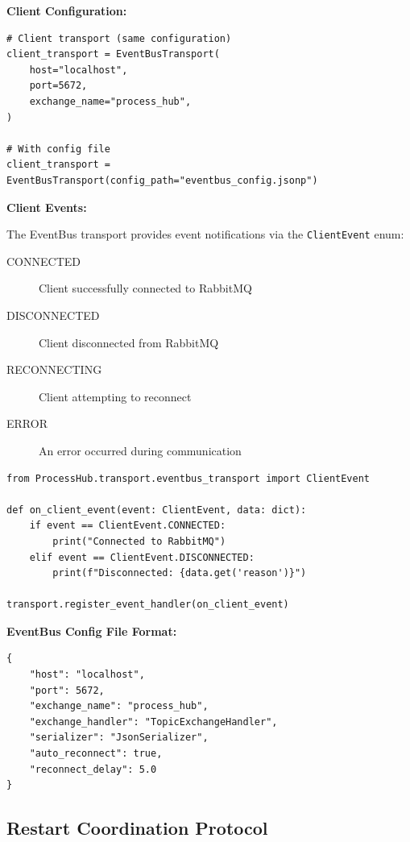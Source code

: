 \textbf{Client Configuration:}

\begin{verbatim}
# Client transport (same configuration)
client_transport = EventBusTransport(
    host="localhost",
    port=5672,
    exchange_name="process_hub",
)

# With config file
client_transport = EventBusTransport(config_path="eventbus_config.jsonp")
\end{verbatim}

\textbf{Client Events:}

The EventBus transport provides event notifications via the \texttt{ClientEvent} enum:

\begin{description}
   \item[CONNECTED] Client successfully connected to RabbitMQ
   \item[DISCONNECTED] Client disconnected from RabbitMQ
   \item[RECONNECTING] Client attempting to reconnect
   \item[ERROR] An error occurred during communication
\end{description}

\begin{verbatim}
from ProcessHub.transport.eventbus_transport import ClientEvent

def on_client_event(event: ClientEvent, data: dict):
    if event == ClientEvent.CONNECTED:
        print("Connected to RabbitMQ")
    elif event == ClientEvent.DISCONNECTED:
        print(f"Disconnected: {data.get('reason')}")

transport.register_event_handler(on_client_event)
\end{verbatim}

\textbf{EventBus Config File Format:}

\begin{verbatim}
{
    "host": "localhost",
    "port": 5672,
    "exchange_name": "process_hub",
    "exchange_handler": "TopicExchangeHandler",
    "serializer": "JsonSerializer",
    "auto_reconnect": true,
    "reconnect_delay": 5.0
}
\end{verbatim}

\subsection{Restart Coordination Protocol}

